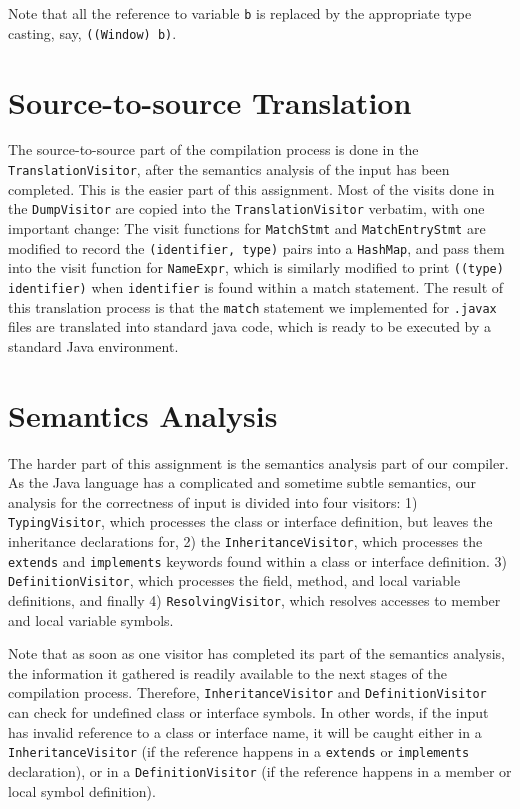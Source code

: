 \documentclass[twocolumn]{article}
\begin{document}
Note that all the reference to variable \verb|b| is replaced by the
appropriate type casting, say, {\tt ((Window) b)}.

\section{Source-to-source Translation}
The source-to-source part of the compilation process is done
in the \verb|TranslationVisitor|, after the semantics analysis of the input has been
completed. This is the easier part of this
assignment. Most of the visits done in the \verb|DumpVisitor| are
copied into the \verb|TranslationVisitor| verbatim, with one important
change: The visit functions for \verb|MatchStmt| and
\verb|MatchEntryStmt| are modified to record the {\tt (identifier,
type)} pairs into a \verb|HashMap|, and pass them into the visit
function for \verb|NameExpr|, which is similarly modified to print
{\tt ((type) identifier)} when \verb|identifier| is found within
a match statement. The result of this translation process is
that the \verb|match| statement we implemented for \verb|.javax|
files are translated into standard java code, which is ready
to be executed by a standard Java environment.

\section{Semantics Analysis}
The harder part of this assignment is the semantics analysis
part of our compiler. As the Java language has a complicated
and sometime subtle semantics, our analysis for the correctness
of input is divided into four visitors: 1) \verb|TypingVisitor|, which
processes the class or interface definition, but leaves the inheritance
declarations for, 2) the \verb|InheritanceVisitor|, which processes the \verb|extends|
and \verb|implements| keywords found within a class or interface definition.
3) \verb|DefinitionVisitor|, which processes the field, method, and local variable
definitions, and finally 4) \verb|ResolvingVisitor|, which resolves accesses to
member and local variable symbols.

Note that as soon as one visitor has completed its part of the semantics
analysis, the information it gathered is readily available to the next
stages of the compilation process. Therefore, \verb|InheritanceVisitor| and \verb|DefinitionVisitor|
can check for undefined class or interface symbols. In other words, if the
input has invalid reference to a class or interface name, it will be caught
either in a \verb|InheritanceVisitor| (if the reference happens in a \verb|extends| or
\verb|implements| declaration), or in a \verb|DefinitionVisitor| (if the reference happens
in a member or local symbol definition).
\end{document}
